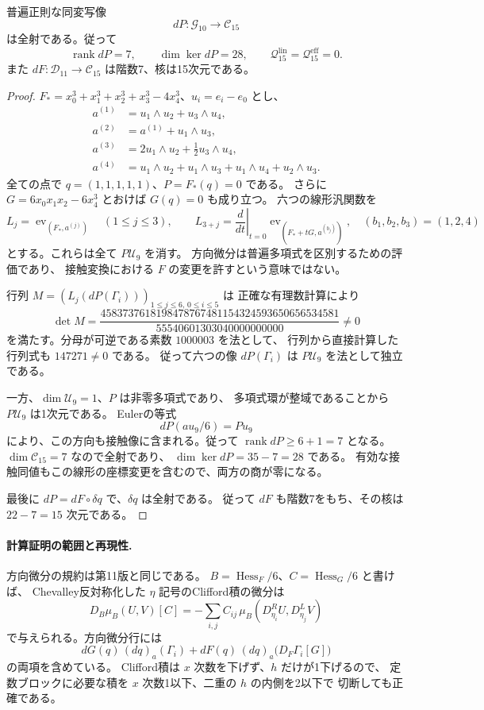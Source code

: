 \begin{proposition}[15次の普遍接触商の消滅]
\label{prop:v12-contact-rank-fifteenth}
普遍正則な同変写像
\[
 dP:\mathcal G_{10}\longrightarrow\mathcal C_{15}
\]
は全射である。従って
\[
 \operatorname{rank}dP=7,\qquad \dim\ker dP=28,
 \qquad\mathcal Q^{\mathrm{lin}}_{15}
       =\mathcal Q^{\mathrm{eff}}_{15}=0.
\]
また $dF:\mathcal D_{11}\to\mathcal C_{15}$ は階数7、核は15次元である。
\end{proposition}
\begin{proof}
$F_*=x_0^3+x_1^3+x_2^3+x_3^3-4x_4^3$、$u_i=e_i-e_0$ とし、
\begin{align*}
 a^{(1)}&=u_1\wedge u_2+u_3\wedge u_4,\\
 a^{(2)}&=a^{(1)}+u_1\wedge u_3,\\
 a^{(3)}&=2u_1\wedge u_2+\tfrac12u_3\wedge u_4,\\
 a^{(4)}&=u_1\wedge u_2+u_1\wedge u_3
                    +u_1\wedge u_4+u_2\wedge u_3.
\end{align*}
全ての点で $q=(1,1,1,1,1)$、$P=F_*(q)=0$ である。
さらに $G=6x_0x_1x_2-6x_4^3$ とおけば $G(q)=0$ も成り立つ。
六つの線形汎関数を
\[
 L_j=\operatorname{ev}_{(F_*,a^{(j)})}\quad(1\le j\le3),
 \qquad
 L_{3+j}=\left.\frac{d}{dt}\right|_{t=0}
       \operatorname{ev}_{(F_*+tG,a^{(b_j)})},
 \quad (b_1,b_2,b_3)=(1,2,4)
\]
とする。これらは全て $P\mathcal U_9$ を消す。
方向微分は普遍多項式を区別するための評価であり、
接触変換における $F$ の変更を許すという意味ではない。

行列 $M=(L_j(dP(\Gamma_i)))_{1\le j\le6,\,0\le i\le5}$ は
正確な有理数計算により
\[
 \det M=
 \frac{4583737618198478767481154324593650656534581}
      {55540601303040000000000}\ne0
\]
を満たす。分母が可逆である素数 $1000003$ を法として、
行列から直接計算した行列式も $147271\ne0$ である。
従って六つの像 $dP(\Gamma_i)$ は $P\mathcal U_9$ を法として独立である。

一方、$\dim\mathcal U_9=1$、$P$ は非零多項式であり、
多項式環が整域であることから $P\mathcal U_9$ は1次元である。
Eulerの等式
\[
 dP(au_9/6)=Pu_9
\]
により、この方向も接触像に含まれる。従って
$\operatorname{rank}dP\ge6+1=7$ となる。
$\dim\mathcal C_{15}=7$ なので全射であり、
$\dim\ker dP=35-7=28$ である。
有効な接触同値もこの線形の座標変更を含むので、両方の商が零になる。

最後に $dP=dF\circ\delta q$ で、$\delta q$ は全射である。
従って $dF$ も階数7をもち、その核は $22-7=15$ 次元である。
\end{proof}

\paragraph{計算証明の範囲と再現性.}
方向微分の規約は第11版と同じである。
$B=\operatorname{Hess}_F/6$、$C=\operatorname{Hess}_G/6$ と書けば、
Chevalley反対称化した $\eta$ 記号のClifford積の微分は
\[
 D_B\mu_B(U,V)[C]
 =-\sum_{i,j}C_{ij}\,
       \mu_B(D^R_{\eta_i}U,D^L_{\eta_j}V)
\]
で与えられる。方向微分行には
\[
 dG(q)\,(dq)_a(\Gamma_i)
 +dF(q)\,(dq)_a\bigl(D_F\Gamma_i[G]\bigr)
\]
の両項を含めている。
Clifford積は $x$ 次数を下げず、$h$ だけが1下げるので、
定数ブロックに必要な積を $x$ 次数1以下、二重の $h$ の内側を2以下で
切断しても正確である。

